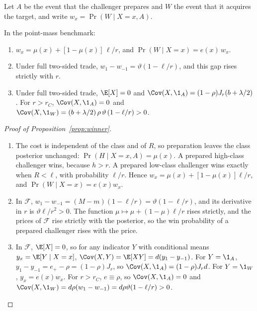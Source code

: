 Let \(A\) be the event that the challenger prepares and \(W\) the event that it acquires the target, and write
\(w_x=\Pr(W\mid X=x,A)\).

\begin{proposition}\label{prop:winner}
In the point-mass benchmark:
\begin{enumerate}[label=(\roman*),leftmargin=2em]
\item \(w_x=\mu(x)+[1-\mu(x)]\,\ell/r\), and \(\Pr(W\mid X=x)=e(x)\,w_x\).
\item Under full two-sided trade, \(w_1-w_{-1}=\vartheta(1-\ell/r)\), and this gap rises strictly with \(r\).
\item Under full two-sided trade, \(\E[X]=0\) and \(\Cov(X,\1_A)=(1-\rho)J_r(b+\lambda/2)\). For \(r>r_C\),
\(\Cov(X,\1_A)=0\) and \(\Cov(X,\1_W)=(b+\lambda/2)\,\rho\,\vartheta\,(1-\ell/r)>0\).
\end{enumerate}
\end{proposition}

\begin{proof}[Proof of Proposition~\ref{prop:winner}]
\begin{enumerate}[label=(\roman*),leftmargin=2em]
\item The cost is independent of the class and of \(R\), so preparation leaves the class posterior unchanged:
\(\Pr(H\mid X=x,A)=\mu(x)\). A prepared high-class challenger wins, because \(h>r\). A prepared low-class challenger
wins exactly when \(R<\ell\), with probability \(\ell/r\). Hence \(w_x=\mu(x)+[1-\mu(x)]\ell/r\), and
\(\Pr(W\mid X=x)=e(x)w_x\).
\item In \(\mathcal F\), \(w_1-w_{-1}=(M-m)(1-\ell/r)=\vartheta(1-\ell/r)\), and its derivative in \(r\) is
\(\vartheta\ell/r^2>0\). The function \(\mu\mapsto\mu+(1-\mu)\ell/r\) rises strictly, and the prices of \(\mathcal F\) rise
strictly with the posterior, so the win probability of a prepared challenger rises with the price.
\item In \(\mathcal F\), \(\E[X]=0\), so for any indicator \(Y\) with conditional means \(y_x=\E[Y\mid X=x]\),
\(\Cov(X,Y)=\E[XY]=d(y_1-y_{-1})\). For \(Y=\1_A\), \(y_1-y_{-1}=e_+-\rho=(1-\rho)J_r\), so
\(\Cov(X,\1_A)=(1-\rho)J_rd\). For \(Y=\1_W\), \(y_x=e(x)w_x\). For \(r>r_C\), \(e\equiv\rho\), so \(\Cov(X,\1_A)=0\) and
\(\Cov(X,\1_W)=d\rho(w_1-w_{-1})=d\rho\vartheta(1-\ell/r)>0\).\qedhere
\end{enumerate}
\end{proof}

